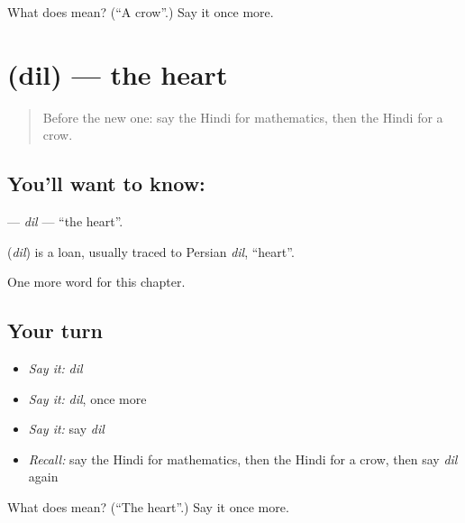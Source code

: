 \begin{tcolorbox}[breakable,colback=teal!4,colframe=teal!35!black,title={Before you move on}]
What does  mean? (\textquotedblleft{}A crow\textquotedblright{}.) Say it once more.
\end{tcolorbox}
\section[\texorpdfstring{\hi{दिल} (dil)}{दिल (dil)}]{ (dil) — the heart}

\label{lesson:HI-C199-dil}



\begin{quote}
Before the new one: say the Hindi for mathematics, then the Hindi for a crow.
\end{quote}

\subsection*{You'll want to know: }
\textbf{} — \emph{dil} — \textquotedblleft{}the heart\textquotedblright{}.

\begin{cousinweb}
\textbf{} (\emph{dil}) is a loan, usually traced to Persian \emph{dil}, \textquotedblleft{}heart\textquotedblright{}.
\end{cousinweb}

\begin{grammarlens}[title={What you've built}]
One more word for this chapter.
\end{grammarlens}

\subsection*{Your turn}
\begin{itemize}
\raggedright
  \item \emph{Say it:} \emph{dil}
  \item \emph{Say it:} \emph{dil}, once more
  \item \emph{Say it:} say \emph{dil}
  \item \emph{Recall:} say the Hindi for mathematics, then the Hindi for a crow, then say \emph{dil} again
\end{itemize}

\begin{tcolorbox}[breakable,colback=teal!4,colframe=teal!35!black,title={Before you move on}]
What does  mean? (\textquotedblleft{}The heart\textquotedblright{}.) Say it once more.
\end{tcolorbox}
